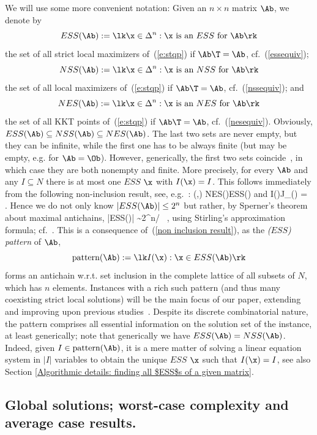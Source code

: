 \documentclass[moor]{informs3}              %
\def\reff#1{(\ref{#1})}
\def\coma#1{{#1}}
\begin{document}
We will use some more convenient notation:
Given an $n\times n$ matrix $\Ab$, we denote by
$$ESS(\Ab) :=\lk \x\in \Delta ^n : \x\mbox{ is an $ESS$ for }\Ab\rk$$
the set of all strict local maximizers of~\reff{e:stqp} if $\Ab\T=\Ab$, cf.~\reff{essequiv};
$$NSS(\Ab) :=\lk \x\in \Delta ^n : \x\mbox{ is an $NSS$ for }\Ab\rk$$
the set of all local maximizers of~\reff{e:stqp} if $\Ab\T=\Ab$, cf.~\reff{nssequiv}; and
$$NES(\Ab) :=\lk \x\in \Delta ^n : \x\mbox{ is an $NES$ for }\Ab\rk$$
the set of all KKT points of~\reff{e:stqp} if $\Ab\T=\Ab$, cf.~\reff{nesequiv}.
Obviously, $ESS(\Ab)\subseteq NSS(\Ab) \subseteq NES(\Ab)$. The last two sets are never empty, but they can be infinite, while the first one has to be always finite (but may be empty, e.g. for $\Ab=\Ob$). However, generically, the first two sets coincide~\cite[Corollary~14]{Bomz02a}, in which case they are both nonempty and finite.
More precisely, for every $\Ab$ and any $I\subseteq N$ there is at most one $ESS$ $\x$ with $I(\x) = I$. This follows immediately from the following non-inclusion result, see, e.g.~\cite{Bish76}:
(\x,\p) \in NES(\Ab)\times ESS(\Ab) \quad \mbox{and} \quad  I(\x)\subseteq J_{\Ab}(\p) \qquad \Longrightarrow \qquad \x=\p\, .
\eeq
Hence we do not only know $|ESS(\Ab)|\le 2^n$ but rather, by Sperner's theorem about maximal antichains,
|ESS(\Ab)|\le  {} {\left \lfloor {} \right \rfloor}\sim 2^n/ \, ,
\eeq
using Stirling's approximation formula; \coma{cf.~\cite{Bish76}.} This is a consequence of~\reff{non inclusion result}, as the {\em ($ESS$) pattern} of $\Ab$,
$$\textup{pattern}(\Ab):=\lk I(\x) : \x\in ESS(\Ab)\rk$$
forms an antichain w.r.t. set inclusion in the complete lattice of all subsets of $N$, which has $n$ elements.
Instances with a rich such pattern (and thus many coexisting strict local solutions) will be the main focus of our paper, extending and improving upon previous studies~\cite{Broo93a,Broo94a,Broo96a,Cann88a,Vick88b,Vick88a}. Despite its discrete combinatorial nature, the pattern comprises all essential information on the solution set of the instance, at least generically; note that generically we have $ESS(\Ab) = NSS(\Ab)$. Indeed, given $I\in \textup{pattern}(\Ab)$, it is a mere matter of solving a linear equation system in $|I|$ variables to obtain the unique $ESS$ $\x$ such that $I(\x)=I$, see also Section \ref{Algorithmic details: finding all $ESS$s of a given matrix}.


\subsection{Global solutions; worst-case complexity and average case results.}\label{avg}
\end{document}
